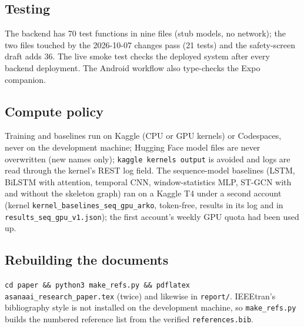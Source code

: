 \subsection{Testing}
The backend has 70 test functions in nine files (stub models, no network); the two files touched by the 2026-10-07 changes pass (21 tests) and the safety-screen draft adds 36. The live smoke test checks the deployed system after every backend deployment. The Android workflow also type-checks the Expo companion.

\subsection{Compute policy}
Training and baselines run on Kaggle (CPU or GPU kernels) or Codespaces, never on the development machine; Hugging Face model files are never overwritten (new names only); \texttt{kaggle kernels output} is avoided and logs are read through the kernel's REST log field. The sequence-model baselines (LSTM, BiLSTM with attention, temporal CNN, window-statistics MLP, ST-GCN with and without the skeleton graph) ran on a Kaggle T4 under a second account (kernel \texttt{kernel\_baselines\_seq\_gpu\_arko}, token-free, results in its log and in \texttt{results\_seq\_gpu\_v1.json}); the first account's weekly GPU quota had been used up.

\subsection{Rebuilding the documents}
\texttt{cd paper \&\& python3 make\_refs.py \&\& pdflatex asanaai\_research\_paper.tex} (twice) and likewise in \texttt{report/}. IEEEtran's bibliography style is not installed on the development machine, so \texttt{make\_refs.py} builds the numbered reference list from the verified \texttt{references.bib}.
